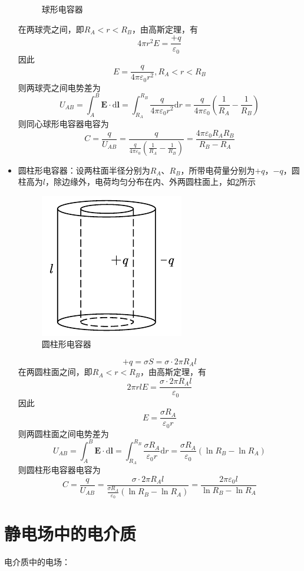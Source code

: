 \documentclass[12pt, a4paper, twoside]{ctexbook}
\begin{document}
\begin{itemize}
\begin{figure}[H]
        \caption{球形电容器}\label{fig:球形电容器}
    \end{figure}
    在两球壳之间，即$R_A<r<R_B$，由高斯定理，有
    $$
    4\pi r^2E=\frac{+q}{\varepsilon_0}
    $$
    因此
    $$
    E=\frac{q}{4\pi\varepsilon_0r^2},R_A<r<R_B
    $$
    则两球壳之间电势差为
    $$
    U_{AB}=\int_{A}^{B}\boldsymbol{E}\cdot\mathrm{d}\boldsymbol{l}=\int_{R_A}^{R_B}\frac{q}{4\pi\varepsilon_0r^2}\mathrm{d}r=\frac{q}{4\pi\varepsilon_0}\left(\frac{1}{R_A}-\frac{1}{R_B}\right)
    $$
    则同心球形电容器电容为
    $$
    C=\frac{q}{U_{AB}}=\frac{q}{\frac{q}{4\pi\varepsilon_0}\left(\frac{1}{R_A}-\frac{1}{R_B}\right)}=\frac{4\pi\varepsilon_0R_AR_B}{R_B-R_A}
    $$
    \item {\sonti 圆柱形电容器}：设两柱面半径分别为$R_A$、$R_B$，所带电荷量分别为$+q$，$-q$，圆柱高为$l$，除边缘外，电荷均匀分布在内、外两圆柱面上，如\textcolor{blue}{\cref{fig:圆柱形电容器}}所示
    \begin{figure}[H]
        \centerline{\includegraphics[scale=1.4]{圆柱形电容器.pdf}}
        \caption{圆柱形电容器}\label{fig:圆柱形电容器}
    \end{figure}
    $$
    +q=\sigma S=\sigma\cdot2\pi R_Al
    $$
    在两圆柱面之间，即$R_A<r<R_B$，由高斯定理，有
    $$
    2\pi rlE=\frac{\sigma\cdot2\pi R_Al}{\varepsilon_0}
    $$
    因此
    $$
    E=\frac{\sigma R_A}{\varepsilon_0r}
    $$
    则两圆柱面之间电势差为
    $$
    U_{AB}=\int_{A}^{B}\boldsymbol{E}\cdot\mathrm{d}\boldsymbol{l}=\int_{R_A}^{R_B}\frac{\sigma R_A}{\varepsilon_0r}\mathrm{d}r=\frac{\sigma R_A}{\varepsilon_0}\left(\ln R_B-\ln R_A\right)
    $$
    则圆柱形电容器电容为
    $$
    C=\frac{q}{U_{AB}}=\frac{\sigma\cdot2\pi R_Al}{\frac{\sigma R_A}{\varepsilon_0}\left(\ln R_B-\ln R_A\right)}=\frac{2\pi\varepsilon_0l}{\ln R_B-\ln R_A}
    $$
\end{itemize}
\section{静电场中的电介质}
{\sonti 电介质中的电场}：
\end{document}
